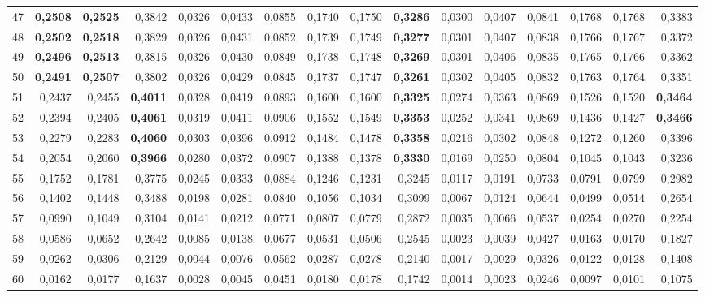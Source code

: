 \begin{table}[htp!]
\begin{adjustwidth}{-2cm}{}
\begin{tabular}{ l | *{15}{| r}}
47	&	\textbf{0,2508}	&	\textbf{0,2525}	&	0,3842	&	0,0326	&	0,0433	&	0,0855	&	0,1740	&	0,1750	&	\textbf{0,3286}	&	0,0300	&	0,0407	&	0,0841	&	0,1768	&	0,1768	&	0,3383	\\
48	&	\textbf{0,2502}	&	\textbf{0,2518}	&	0,3829	&	0,0326	&	0,0431	&	0,0852	&	0,1739	&	0,1749	&	\textbf{0,3277}	&	0,0301	&	0,0407	&	0,0838	&	0,1766	&	0,1767	&	0,3372	\\
49	&	\textbf{0,2496}	&	\textbf{0,2513}	&	0,3815	&	0,0326	&	0,0430	&	0,0849	&	0,1738	&	0,1748	&	\textbf{0,3269}	&	0,0301	&	0,0406	&	0,0835	&	0,1765	&	0,1766	&	0,3362	\\
50	&	\textbf{0,2491}	&	\textbf{0,2507}	&	0,3802	&	0,0326	&	0,0429	&	0,0845	&	0,1737	&	0,1747	&	\textbf{0,3261}	&	0,0302	&	0,0405	&	0,0832	&	0,1763	&	0,1764	&	0,3351	\\
51	&	0,2437	&	0,2455	&	\textbf{0,4011}	&	0,0328	&	0,0419	&	0,0893	&	0,1600	&	0,1600	&	\textbf{0,3325}	&	0,0274	&	0,0363	&	0,0869	&	0,1526	&	0,1520	&	\textbf{0,3464}	\\
52	&	0,2394	&	0,2405	&	\textbf{0,4061}	&	0,0319	&	0,0411	&	0,0906	&	0,1552	&	0,1549	&	\textbf{0,3353}	&	0,0252	&	0,0341	&	0,0869	&	0,1436	&	0,1427	&	\textbf{0,3466}	\\
53	&	0,2279	&	0,2283	&	\textbf{0,4060}	&	0,0303	&	0,0396	&	0,0912	&	0,1484	&	0,1478	&	\textbf{0,3358}	&	0,0216	&	0,0302	&	0,0848	&	0,1272	&	0,1260	&	0,3396	\\
54	&	0,2054	&	0,2060	&	\textbf{0,3966}	&	0,0280	&	0,0372	&	0,0907	&	0,1388	&	0,1378	&	\textbf{0,3330}	&	0,0169	&	0,0250	&	0,0804	&	0,1045	&	0,1043	&	0,3236	\\
55	&	0,1752	&	0,1781	&	0,3775	&	0,0245	&	0,0333	&	0,0884	&	0,1246	&	0,1231	&	0,3245	&	0,0117	&	0,0191	&	0,0733	&	0,0791	&	0,0799	&	0,2982	\\
56	&	0,1402	&	0,1448	&	0,3488	&	0,0198	&	0,0281	&	0,0840	&	0,1056	&	0,1034	&	0,3099	&	0,0067	&	0,0124	&	0,0644	&	0,0499	&	0,0514	&	0,2654	\\
57	&	0,0990	&	0,1049	&	0,3104	&	0,0141	&	0,0212	&	0,0771	&	0,0807	&	0,0779	&	0,2872	&	0,0035	&	0,0066	&	0,0537	&	0,0254	&	0,0270	&	0,2254	\\
58	&	0,0586	&	0,0652	&	0,2642	&	0,0085	&	0,0138	&	0,0677	&	0,0531	&	0,0506	&	0,2545	&	0,0023	&	0,0039	&	0,0427	&	0,0163	&	0,0170	&	0,1827	\\
59	&	0,0262	&	0,0306	&	0,2129	&	0,0044	&	0,0076	&	0,0562	&	0,0287	&	0,0278	&	0,2140	&	0,0017	&	0,0029	&	0,0326	&	0,0122	&	0,0128	&	0,1408	\\
60	&	0,0162	&	0,0177	&	0,1637	&	0,0028	&	0,0045	&	0,0451	&	0,0180	&	0,0178	&	0,1742	&	0,0014	&	0,0023	&	0,0246	&	0,0097	&	0,0101	&	0,1075	\\

\end{tabular}
\end{adjustwidth}
\end{table}
